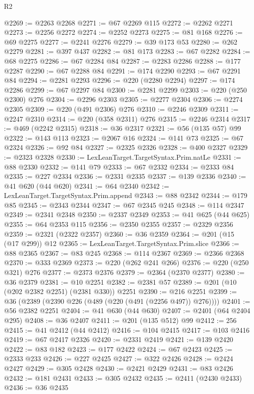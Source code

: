 \begin{lexlean}{R2}
\begin{coremodule}
@2269 := @2263 @2268
@2271 := @67 @2269 @115
@2272 := @2262 @2271
@2273 := @2256 @2272
@2274 := @2252 @2273
@2275 := @81 @168
@2276 := @69 @2275
@2277 := @2241 @2276
@2279 := @39 @173 @53
@2280 := @262 @2279
@2281 := @397 @437
@2282 := @81 @173
@2283 := @67 @2282
@2284 := @68 @2275
@2286 := @67 @2284 @84
@2287 := @2283 @2286
@2288 := @177 @2287
@2290 := @67 @2288 @84
@2291 := @174 @2290
@2293 := @67 @2291 @84
@2294 := @2281 @2293
@2296 := @220 (@2280 @2294)
@2297 := @174 @2286
@2299 := @67 @2297 @84
@2300 := @2281 @2299
@2303 := @220 (@250 @2300) @276
@2304 := @2296 @2303
@2305 := @2277 @2304
@2306 := @2274 @2305
@2309 := @220 (@491 @2306) @276
@2310 := @2246 @2309
@2311 := @2247 @2310
@2314 := @220 (@358 @2311) @276
@2315 := @2246 @2314
@2317 := @469 (@2242 @2315)
@2318 := @36 @2317
@2321 := @56 (@135 @57) @99
@2322 := @143 @113
@2323 := @2067 @16
@2324 := @141 @73
@2325 := @67 @2324
@2326 := @92 @84
@2327 := @2325 @2326
@2328 := @400 @2327
@2329 := @2323 @2328
@2330 := LexLeanTarget.TargetSyntax.Prim.natLe
@2331 := @88 @2330
@2332 := @141 @79
@2333 := @67 @2332
@2334 := @2333 @84
@2335 := @227 @2334
@2336 := @2331 @2335
@2337 := @139 @2336
@2340 := @41 @620 (@44 @620)
@2341 := @64 @2340
@2342 := LexLeanTarget.TargetSyntax.Prim.append
@2343 := @88 @2342
@2344 := @179 @85
@2345 := @2343 @2344
@2347 := @67 @2345 @245
@2348 := @114 @2347
@2349 := @2341 @2348
@2350 := @2337 @2349
@2353 := @41 @625 (@44 @625)
@2355 := @64 @2353 @115
@2356 := @2350 @2355
@2357 := @2329 @2356
@2359 := @2321 (@2322 @2357)
@2360 := @36 @2359
@2364 := @201 (@15 (@17 @299)) @12
@2365 := LexLeanTarget.TargetSyntax.Prim.slice
@2366 := @88 @2365
@2367 := @83 @245
@2368 := @114 @2367
@2369 := @2366 @2368
@2370 := @333 @2369
@2373 := @220 (@262 @241 @266)
@2376 := @220 (@250 @321) @276
@2377 := @2373 @2376
@2379 := @2364 (@2370 @2377)
@2380 := @36 @2379
@2381 := @10 @2251
@2382 := @2381 @57
@2389 := @201 (@10 (@202 @2382 @2251) (@2381 @330)) @2251
@2390 := @216 @2251
@2399 := @36 (@2389 (@2390 @226 (@489 (@220 (@491 (@2256 @497)) @276))))
@2401 := @56 @2382 @2251
@2404 := @41 @630 (@44 @630)
@2407 := @2401 (@64 @2404 @295)
@2408 := @36 @2407
@2411 := @201 (@135 @512) @99
@2412 := 256
@2415 := @41 @2412 (@44 @2412)
@2416 := @104 @2415
@2417 := @103 @2416
@2419 := @67 @2417 @2326
@2420 := @2331 @2419
@2421 := @139 @2420
@2422 := @83 @182
@2423 := @177 @2422
@2424 := @67 @2423
@2425 := @2333 @233
@2426 := @227 @2425
@2427 := @322 @2426
@2428 := @2424 @2427
@2429 := @305 @2428
@2430 := @2421 @2429
@2431 := @83 @2426
@2432 := @181 @2431
@2433 := @305 @2432
@2435 := @2411 (@2430 @2433)
@2436 := @36 @2435

\end{coremodule}
\end{lexlean}
